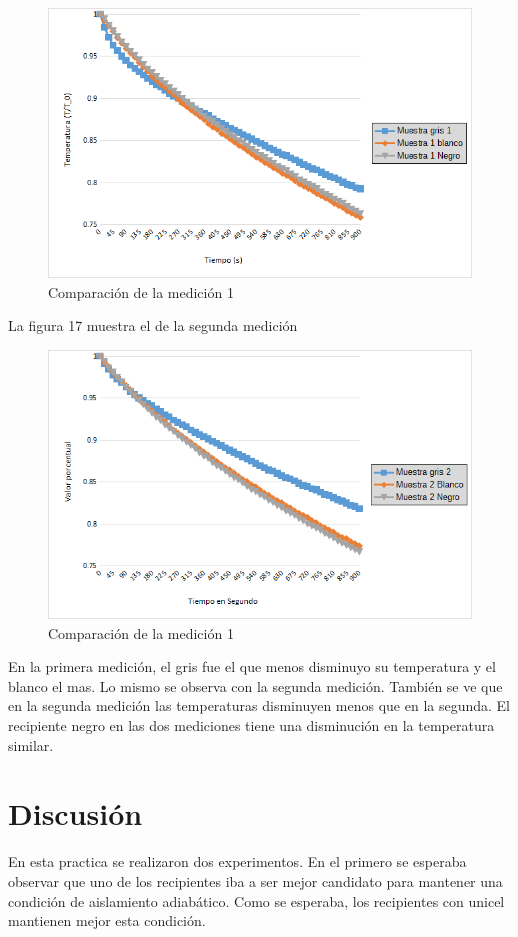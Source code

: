 \documentclass[12pt]{article}
\begin{document}
\begin{figure}[H]
\centering
\includegraphics[scale=0.75]{med1.png}
\caption{Comparación de la medición 1}
\end{figure}	
\pagebreak
La figura 17 muestra el de la segunda medición
\begin{figure}[H]
\centering
\includegraphics[scale=0.75]{med2.png}
\caption{Comparación de la medición 1}
\end{figure}

En la primera medición, el gris fue el que menos disminuyo su temperatura y el blanco el mas. Lo mismo se observa con la segunda medición. También se ve que en la segunda medición las temperaturas disminuyen menos que en la segunda. El recipiente negro en las dos mediciones tiene una disminución en la temperatura similar.
\vspace{-.5cm}
\section{Discusión}
En esta practica se realizaron dos experimentos. En el primero se esperaba observar que uno de los recipientes iba a ser mejor candidato para mantener una condición de aislamiento adiabático. Como se esperaba, los recipientes con unicel mantienen mejor esta condición.
\end{document}

